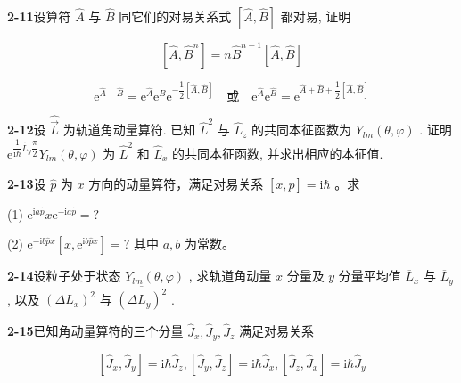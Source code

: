 \vfill

\newpage

\textbf{2-11}\quad 设算符 $\displaystyle \hat{A}$ 与 $\displaystyle \hat{B}$ 同它们的对易关系式 $\displaystyle [\hat{A},\hat{B}]$ 都对易, 证明

$$
[ \hat {A}, \hat {B} ^ {n} ] = n \hat {B} ^ {n - 1} [ \hat {A}, \hat {B} ]
$$

$$
\mathrm{e} ^ {\hat {A} + \hat {B}} = \mathrm{e} ^ {\hat {A}} \mathrm{e} ^ {\hat {B}} \mathrm{e} ^ {- \dfrac {1}{2} [ \hat {A}, \hat {B} ]} \quad \text{或} \quad \mathrm{e} ^ {\hat {A}} \mathrm{e} ^ {\hat {B}} = \mathrm{e} ^ {\hat {A} + \hat {B} + \dfrac {1}{2} [ \hat {A}, \hat {B} ]}
$$

\vfill

\newpage

\textbf{2-12}\quad 设 $\displaystyle \hat{\vec{L}}$ 为轨道角动量算符. 已知 $\displaystyle \hat{L}^2$ 与 $\displaystyle \hat{L}_z$ 的共同本征函数为 $\displaystyle Y_{lm}(\theta, \varphi)$ . 证明 $\displaystyle \mathrm{e}^{\dfrac{1}{\mathrm{i}\hbar}\hat{L}_y\dfrac{\pi}{2}} Y_{lm}(\theta, \varphi)$ 为 $\displaystyle \hat{L}^2$ 和 $\displaystyle \hat{L}_x$ 的共同本征函数, 并求出相应的本征值.

\vfill

\newpage

\textbf{2-13}\quad 设 $\displaystyle \hat{p}$ 为 $\displaystyle x$ 方向的动量算符，满足对易关系 $\displaystyle [x, \hat{p}] = \mathrm{i}\hbar$ 。求

(1) $\displaystyle \mathrm{e}^{\mathrm{i}a\hat{p}} x \mathrm{e}^{-\mathrm{i}a\hat{p}} = ?$

(2) $\displaystyle \mathrm{e}^{-\mathrm{i}b\hat{p} x} [x, \mathrm{e}^{\mathrm{i}b\hat{p} x}] = ?$ 其中 $\displaystyle a, b$ 为常数。

\vfill

\newpage

\textbf{2-14}\quad 设粒子处于状态 $\displaystyle Y_{lm}(\theta, \varphi)$ , 求轨道角动量 $\displaystyle x$ 分量及 $\displaystyle y$ 分量平均值 $\displaystyle \overline{L}_x$ 与 $\displaystyle \overline{L}_y$ , 以及 $\displaystyle \overline{(\Delta L_x)^2}$ 与 $\displaystyle \overline{(\Delta L_y)^2}$ .

\vfill

\newpage

\textbf{2-15}\quad 已知角动量算符的三个分量 $\displaystyle \hat{J}_x, \hat{J}_y, \hat{J}_z$ 满足对易关系

$$
[ \hat {J} _ {x}, \hat {J} _ {y} ] = \mathrm{i} \hbar \hat {J} _ {z}, [ \hat {J} _ {y}, \hat {J} _ {z} ] = \mathrm{i} \hbar \hat {J} _ {x}, [ \hat {J} _ {z}, \hat {J} _ {x} ] = \mathrm{i} \hbar \hat {J} _ {y}
$$

